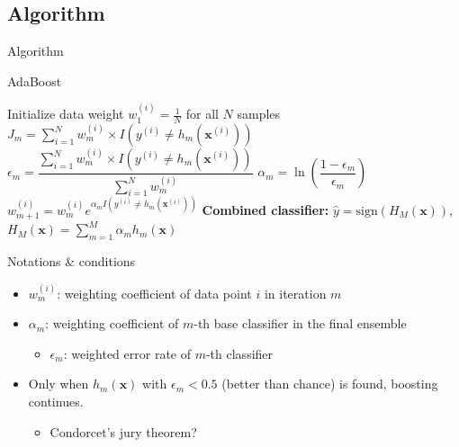 \documentclass[serif, aspectratio=169]{beamer}
\begin{document}
\subsection{Algorithm}

\begin{frame}{Algorithm}
    \begin{algorithm}[H]
    \caption{AdaBoost}\label{alg:AdaBoost}
    \begin{algorithmic}[1]
        \State Initialize data weight $w_1^{(i)} = \frac{1}{N}$ for all $N$ samples
            \State $J_m = \displaystyle\sum_{i=1}^N w_m^{(i)} \times I(y^{(i)} \neq h_m(\boldsymbol{x}^{(i)}))$ 
            \State $\epsilon_m = \dfrac{\sum_{i=1}^N w_m^{(i)} \times I(y^{(i)} \neq h_m(\boldsymbol{x}^{(i)}))}{\sum_{i=1}^N w_m^{(i)}}$ 
            \State $\alpha_m = \ln\left(\dfrac{1 - \epsilon_m}{\epsilon_m}\right)$ 
            \State $w_{m+1}^{(i)} = w_m^{(i)} e^{\alpha_m I(y^{(i)} \neq h_m(\boldsymbol{x}^{(i)}))}$ 
        \EndFor
        \State \textbf{Combined classifier:} $\hat{y} = \text{sign}(H_M(\boldsymbol{x}))$, $H_M(\boldsymbol{x}) = \sum_{m=1}^M \alpha_m h_m(\boldsymbol{x})$
    \end{algorithmic}
    \end{algorithm}
\end{frame}

\begin{frame}{Notations \& conditions}
    \begin{itemize}
        \itemsep1em
        \justifying
        \item $w_m^{(i)}$: weighting coefficient of data point $i$ in iteration $m$
        \item $\alpha_m$: weighting coefficient of $m$-th base classifier in the final ensemble
        \begin{itemize}
            \item $\epsilon_m$: weighted error rate of $m$-th classifier 
        \end{itemize}
    \end{itemize}
    \bigskip \bigskip
    \begin{itemize}
        \itemsep1em
        \justifying
        \item Only when $h_m(\boldsymbol{x})$ with $\epsilon_m < 0.5$ (better than chance) is found, boosting continues.
        \begin{itemize}
            \item Condorcet's jury theorem?
        \end{itemize}
    \end{itemize}
\end{frame}
\end{document}
